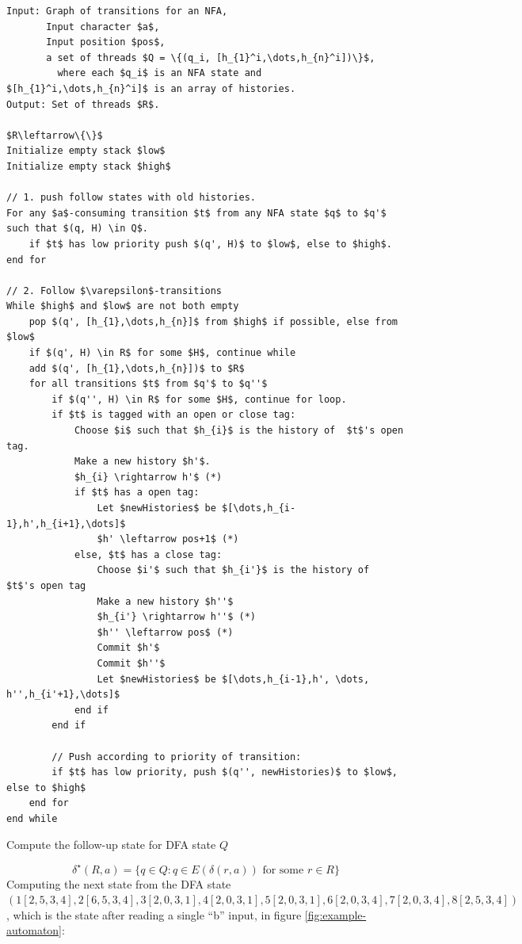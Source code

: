 \documentclass[english]{sigplanconf}
\begin{document}
\begin{algorithm*}[tb]
\begin{lstlisting}[mathescape,tabsize=2]
Input: Graph of transitions for an NFA,
	   Input character $a$,
	   Input position $pos$,
	   a set of threads $Q = \{(q_i, [h_{1}^i,\dots,h_{n}^i])\}$,
	     where each $q_i$ is an NFA state and $[h_{1}^i,\dots,h_{n}^i]$ is an array of histories.
Output: Set of threads $R$.

$R\leftarrow\{\}$
Initialize empty stack $low$
Initialize empty stack $high$

// 1. push follow states with old histories.
For any $a$-consuming transition $t$ from any NFA state $q$ to $q'$ such that $(q, H) \in Q$.
	if $t$ has low priority push $(q', H)$ to $low$, else to $high$.
end for

// 2. Follow $\varepsilon$-transitions
While $high$ and $low$ are not both empty
	pop $(q', [h_{1},\dots,h_{n}]$ from $high$ if possible, else from $low$
	if $(q', H) \in R$ for some $H$, continue while
	add $(q', [h_{1},\dots,h_{n}])$ to $R$
	for all transitions $t$ from $q'$ to $q''$
		if $(q'', H) \in R$ for some $H$, continue for loop.
		if $t$ is tagged with an open or close tag:
			Choose $i$ such that $h_{i}$ is the history of  $t$'s open tag.
			Make a new history $h'$.
			$h_{i} \rightarrow h'$ (*)
			if $t$ has a open tag:
				Let $newHistories$ be $[\dots,h_{i-1},h',h_{i+1},\dots]$
				$h' \leftarrow pos+1$ (*)
			else, $t$ has a close tag:
				Choose $i'$ such that $h_{i'}$ is the history of  $t$'s open tag
				Make a new history $h''$
				$h_{i'} \rightarrow h''$ (*)
				$h'' \leftarrow pos$ (*)
				Commit $h'$
				Commit $h''$
				Let $newHistories$ be $[\dots,h_{i-1},h', \dots, h'',h_{i'+1},\dots]$
			end if
		end if				
				
		// Push according to priority of transition:
		if $t$ has low priority, push $(q'', newHistories)$ to $low$, else to $high$
	end for
end while
\end{lstlisting}
\label{alg:epsilonClosure}
\caption{Compute the follow-up state for DFA state $Q$}
\end{algorithm*}


\[
\delta^{\star}(R,a)=\{q\in Q:q\in E(\delta(r,a))\text{ for some }r\in R\}
\]
Computing the next state from the DFA state $(1[2,5,3,4],2[6,5,3,4],3[2,0,3,1],4[2,0,3,1],5[2,0,3,1],6[2,0,3,4],7[2,0,3,4],8[2,5,3,4])$,
which is the state after reading a single ``b'' input, in figure
\ref{fig:example-automaton}: 
\end{document}
